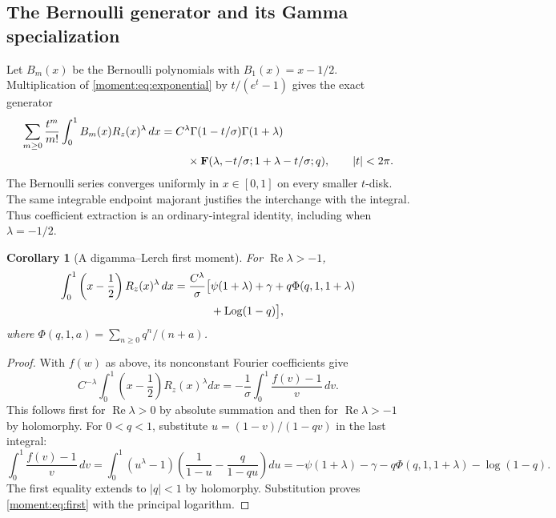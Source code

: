 \documentclass[11pt,a4paper]{article}
\numberwithin{equation}{section}
\newtheorem{corollary}[theorem]{Corollary}
\theoremstyle{definition}
\theoremstyle{remark}
\begin{document}
\subsection{The Bernoulli generator and its Gamma specialization}

Let $B_m(x)$ be the Bernoulli polynomials with
$B_1(x)=x-1/2$. Multiplication of
\eqref{moment:eq:exponential} by $t/(e^t-1)$ gives the exact generator
\begin{align}\label{moment:eq:bernoulli-general}
 \sum_{m\ge0}\frac{t^m}{m!}
   \int_0^1 B_m(x)R_z(x)^\lambda\,dx
 ={}&C^\lambda\Gamma(1-t/\sigma)\Gamma(1+\lambda)\notag\\
 &\quad\times
 \mathbf F(\lambda,-t/\sigma;1+\lambda-t/\sigma;q),
 \qquad |t|<2\pi.
\end{align}
The Bernoulli series converges uniformly in $x\in[0,1]$ on every
smaller $t$-disk. The same integrable endpoint majorant justifies the
interchange with the integral. Thus coefficient extraction is an
ordinary-integral identity, including when $\lambda=-1/2$.

\begin{corollary}[A digamma--Lerch first moment]
\label{moment:cor:first}
For $\operatorname{Re}\lambda>-1$,
\begin{align}\label{moment:eq:first}
 \int_0^1\left(x-\frac12\right)R_z(x)^\lambda\,dx
 =\frac{C^\lambda}{\sigma}\bigl[&\psi(1+\lambda)+\gamma
    +q\Phi(q,1,1+\lambda)\notag\\
    &+\operatorname{Log}(1-q)\bigr],
\end{align}
where $\Phi(q,1,a)=\sum_{n\ge0}q^n/(n+a)$.
\end{corollary}
\begin{proof}
With $f(w)$ as above, its nonconstant Fourier coefficients give
\[
 C^{-\lambda}\int_0^1\left(x-\frac12\right)R_z(x)^\lambda dx
       =-\frac1\sigma\int_0^1\frac{f(v)-1}{v}\,dv.
\]
This follows first for $\operatorname{Re}\lambda>0$ by absolute
summation and then for $\operatorname{Re}\lambda>-1$ by holomorphy.
For $0<q<1$, substitute $u=(1-v)/(1-qv)$ in the last integral:
\[
 \int_0^1\frac{f(v)-1}{v}\,dv
 =\int_0^1(u^\lambda-1)
       \left(\frac1{1-u}-\frac q{1-qu}\right)du
 =-\psi(1+\lambda)-\gamma-q\Phi(q,1,1+\lambda)
      -\log(1-q).
\]
The first equality extends to $|q|<1$ by holomorphy. Substitution
proves \eqref{moment:eq:first} with the principal logarithm.
\end{proof}
\end{document}
